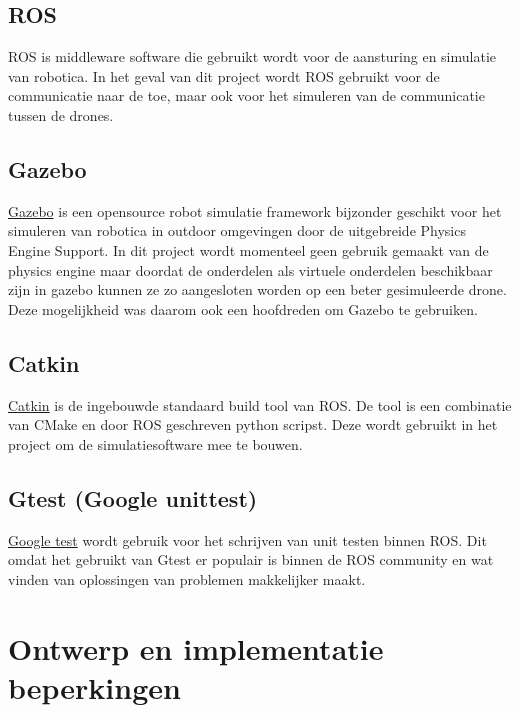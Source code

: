 \documentclass[a4paper, 11pt, oneside]{report}
\begin{document}
\subsection{ROS}
\label{inleiding:werkomgeving:ros}
ROS is middleware software die gebruikt wordt voor de aansturing en simulatie van robotica. 
In het geval van dit project wordt ROS gebruikt voor de communicatie naar de  toe, maar ook voor het simuleren van de  communicatie tussen de drones. 

\subsection{Gazebo}
\label{inleiding:werkomgeving:gazebo}

\href{http://gazebosim.org/}{Gazebo} is een opensource robot simulatie framework bijzonder geschikt voor het simuleren van robotica in outdoor omgevingen door de uitgebreide Physics Engine Support.
In dit project wordt momenteel geen gebruik gemaakt van de physics engine maar doordat de onderdelen als virtuele onderdelen beschikbaar zijn in gazebo kunnen ze zo aangesloten worden op een beter gesimuleerde drone.
Deze mogelijkheid was daarom ook een hoofdreden om Gazebo te gebruiken.

\subsection{Catkin}
\label{inleiding:werkomgeving:catkin}

\href{http://wiki.ros.org/catkin}{Catkin} is de ingebouwde standaard build tool van ROS. De tool is een combinatie van CMake en door ROS geschreven python scripst. Deze wordt gebruikt in het project om de simulatiesoftware mee te bouwen. 


\subsection{Gtest (Google unittest)}
\label{inleiding:werkomgeving:gtest}

\href{https://github.com/google/googletest}{Google test} wordt gebruik voor het schrijven van unit testen binnen ROS. Dit omdat het gebruikt van Gtest er populair is binnen de ROS community en wat vinden van oplossingen van problemen makkelijker maakt. 




\section{Ontwerp en implementatie beperkingen}
\label{inleiding:ontwerpberkingen}
\end{document}
